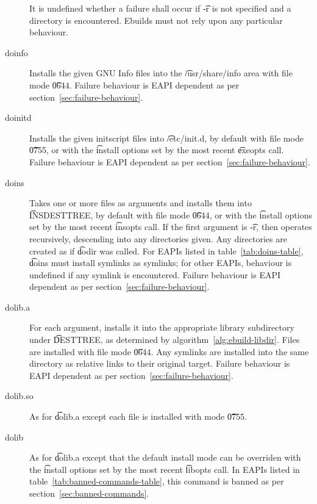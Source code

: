 \begin{description}
    It is undefined whether a failure shall occur if \t{-r} is not specified and a directory is
    encountered. Ebuilds must not rely upon any particular behaviour.

\item[doinfo] Installs the given GNU Info files into the \t{/usr/share/info} area with file mode
    \t{0644}. Failure behaviour is EAPI dependent as per section~\ref{sec:failure-behaviour}.

\item[doinitd] Installs the given initscript files into \t{/etc/init.d}, by default with file mode
    \t{0755}, or with the \t{install} options set by the most recent \t{exeopts} call.
    Failure behaviour is EAPI dependent as per section~\ref{sec:failure-behaviour}.

\item[doins]  Takes one or more files as arguments and installs them into
    \t{INSDESTTREE}, by default with file mode \t{0644}, or with the \t{install} options set by
    the most recent \t{insopts} call. If the first argument is \t{-r}, then operates recursively,
    descending into any directories given. Any directories are created as if \t{dodir} was called.
    For EAPIs listed in table~\ref{tab:doins-table}, \t{doins} must install symlinks as symlinks;
    for other EAPIs, behaviour is undefined if any symlink is encountered. Failure behaviour is
    EAPI dependent as per section~\ref{sec:failure-behaviour}.

\item[dolib.a] For each argument, installs it into the appropriate library subdirectory under
    \t{DESTTREE}, as determined by algorithm~\ref{alg:ebuild-libdir}. Files are installed with file
    mode \t{0644}. Any symlinks are installed into the same directory as relative links to their
    original target. Failure behaviour is EAPI dependent as per section~\ref{sec:failure-behaviour}.

\item[dolib.so] As for \t{dolib.a} except each file is installed with mode \t{0755}.

\item[dolib] As for \t{dolib.a} except that the default install mode can be overriden with
    the \t{install} options set by the most recent \t{libopts} call. In EAPIs listed
    in table~\ref{tab:banned-commands-table}, this command is banned as per
    section~\ref{sec:banned-commands}.


\end{description}
